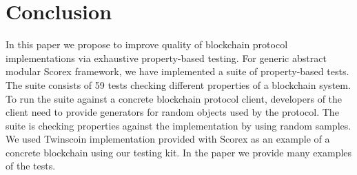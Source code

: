 
\section{Conclusion}
\label{sec:conclusion}

In this paper we propose to improve quality of blockchain protocol implementations via exhaustive property-based testing. For generic abstract modular Scorex framework, we have implemented a suite of property-based tests. The suite consists of 59 tests checking different properties of a blockchain system. To run the suite against a concrete blockchain protocol client, developers of the client need to provide generators for random objects used by the protocol. The suite is checking properties against the implementation by using random samples. We used Twinscoin implementation provided with Scorex as an example of a concrete blockchain using our testing kit. In the paper we provide many examples of the tests.  